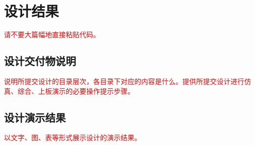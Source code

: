\section{设计结果}
\textcolor{red}{请不要大篇幅地直接粘贴代码。}

\subsection{设计交付物说明}
\textcolor{red}{说明所提交设计的目录层次，各目录下对应的内容是什么。提供所提交设计进行仿真、综合、上板演示的必要操作提示步骤。}

\subsection{设计演示结果}
\textcolor{red}{以文字、图、表等形式展示设计的演示结果。}